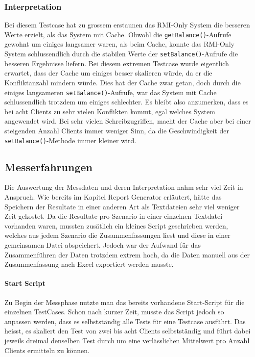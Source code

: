 \subsubsection{Interpretation}

Bei diesem Testcase hat zu grossem erstaunen das RMI-Only System die besseren Werte erzielt, als das System mit Cache. Obwohl die \texttt{getBalance()}-Aufrufe gewohnt um einiges langsamer waren, als beim Cache, konnte das RMI-Only System schlussendlich durch die stabilen Werte der \texttt{setBalance()}-Aufrufe die besseren Ergebnisse liefern.\newline
 Bei diesem extremen Testcase wurde eigentlich erwartet, dass der Cache um einiges besser skalieren würde, da er die Konfliktanzahl mindern würde. Dies hat der Cache zwar getan, doch durch die einiges langsameren \texttt{setBalance()}-Aufrufe, war das System mit Cache schlussendlich trotzdem um einiges schlechter. \newline
Es bleibt also anzumerken, dass es bei acht Clients zu sehr vielen Konflikten kommt, egal welches System angewendet wird. Bei sehr vielen Schreibzugriffen, macht der Cache aber bei einer steigenden Anzahl Clients immer weniger Sinn, da die Geschwindigkeit der  \texttt{setBalance()}-Methode immer kleiner wird.

\subsection{Messerfahrungen}
Die Auswertung der Messdaten und deren Interpretation nahm sehr viel Zeit in Anspruch. Wie bereits im Kapitel Report Generator erläutert, hätte das Speichern der Resultate in einer anderen Art als Textdateien sehr viel weniger Zeit gekostet. Da die Resultate pro Szenario in einer einzelnen Textdatei vorhanden waren, mussten zusätlich ein kleines Script geschrieben werden, welches  aus jedem Szenario die Zusammenfassungen liest und diese in einer gemeinsamen Datei abspeichert. Jedoch war der Aufwand für das Zusammenführen der Daten trotzdem extrem hoch, da die Daten manuell aus der Zusammenfassung nach Excel exportiert werden musste. 

\paragraph{Start Script}
Zu Begin der Messphase nutzte man das bereits vorhandene Start-Script für die einzelnen TestCases. Schon nach kurzer Zeit, musste das Script jedoch so anpassen werden, dass es selbstständig alle Tests für eine Testcase ausführt. Das heisst, es skaliert den Test von zwei bis acht Clients selbstständig und führt dabei jeweils dreimal denselben Test durch um eine verlässlichen Mittelwert pro Anzahl Clients ermitteln zu können.

